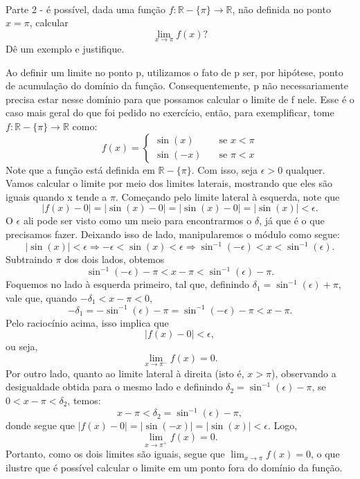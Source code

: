 \documentclass[Calculus1/exercícios_de_cálculo.tex]{subfiles}
\begin{document}
\paragraph{} Parte 2 - é possível, dada uma função $f:\mathbb{R}-\{\pi\}\rightarrow \mathbb{R}$, não definida no ponto $x=\pi$, calcular
$$
	\lim_{x\to\pi}f(x)?
$$
Dê um exemplo e justifique.
\begin{sol*}
	Ao definir um limite no ponto p, utilizamos o fato de p ser, por hipótese, ponto de acumulação do domínio da função. Consequentemente, p n\~ao necessariamente precisa estar nesse dom\'inio para que possamos calcular o limite de f nele. Esse é o caso mais geral do que foi pedido no exerc\'icio, ent\~ao, para exemplificar, tome $f:\mathbb{R}-\{\pi\}\rightarrow\mathbb{R}$ como:
	$$
		f(x) = \left\{\begin{array}{ll}
			\sin(x)  & \quad \text{se } x < \pi \\
			\sin(-x) & \quad \text{se } \pi < x
		\end{array}\right.
	$$
	Note que a função está definida em $\mathbb{R}-\{\pi\}.$ Com isso, seja $\epsilon > 0$ qualquer. Vamos calcular o limite por meio dos limites laterais, mostrando que eles são iguais quando x tende a $\pi$. Começando pelo limite lateral à esquerda, note que
	$$
		|f(x) - 0| = |\sin(x) - 0| = |\sin(x) - 0| = |\sin(x)|< \epsilon.
	$$
	O $\epsilon$ ali pode ser visto como um meio para encontrarmos o $\delta$, já que é o que precisamos fazer. Deixando isso de lado, manipularemos o módulo como segue:
	$$
		|\sin(x)| < \epsilon \Rightarrow -\epsilon < \sin(x) < \epsilon \Rightarrow \sin^{-1}(-\epsilon) < x < \sin^{-1}(\epsilon).
	$$
	Subtraindo $\pi$ dos dois lados, obtemos
	$$
		\sin^{-1}(-\epsilon) - \pi < x - \pi < \sin^{-1}(\epsilon) - \pi.
	$$
	Foquemos no lado à esquerda primeiro, tal que, definindo $\delta_1 = \sin^{-1}(\epsilon) + \pi$, vale que, quando $-\delta_1 < x - \pi < 0$,
	$$
		-\delta_1 = -\sin^{-1}(\epsilon) - \pi = \sin^{-1}(-\epsilon) - \pi < x - \pi.
	$$
	Pelo raciocínio acima, isso implica que
	$$
		|f(x) - 0| < \epsilon,
	$$
	ou seja,
	$$
		\lim_{x\to\pi^{-}}f(x) = 0.
	$$
	Por outro lado, quanto ao limite lateral à direita (isto é, $x > \pi$), observando a desigualdade obtida para o mesmo lado e definindo $\delta_2 = \sin^{-1}(\epsilon) - \pi $, se $0 < x - \pi < \delta_2$, temos:
	$$
		x - \pi < \delta_2 = \sin^{-1}(\epsilon) - \pi,
	$$
	donde segue que $|f(x) - 0| = |\sin(-x)| = |\sin(x)| < \epsilon$. Logo,
	$$
		\lim_{x\to\pi^{+}}f(x) = 0.
	$$
	Portanto, como os dois limites são iguais, segue que $\lim_{x\to\pi} f(x) = 0$, o que ilustre que é possível calcular o limite em um ponto fora do dom\'inio da função.
	\qedsymbol
\end{sol*}
\end{document}

